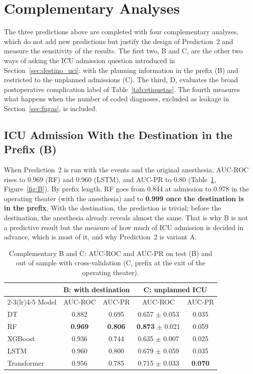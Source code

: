 \section{Complementary Analyses}

The three predictions above are completed with four complementary analyses, which do not add new predictions but justify the design of Prediction~2 and measure the sensitivity of the results. The first two, B and C, are the other two ways of asking the ICU admission question introduced in Section~\ref{sec:destino_uci}: with the planning information in the prefix (B) and restricted to the unplanned admissions (C). The third, D, evaluates the broad postoperative complication label of Table~\ref{tab:etiquetas}. The fourth measures what happens when the number of coded diagnoses, excluded as leakage in Section~\ref{sec:fugas}, is included.

\subsection{ICU Admission With the Destination in the Prefix (B)}
\label{sec:compl_b}

When Prediction~2 is run with the  events and the original anesthesia, AUC-ROC rises to 0.969 (RF) and 0.960 (LSTM), and AUC-PR to 0.80 (Table~\ref{tab:compl_bc}, Figure~\ref{fig:B}). By prefix length, RF goes from 0.844 at admission to 0.978 in the operating theater (with the  anesthesia) and to \textbf{0.999 once the destination is in the prefix}. With the destination, the prediction is trivial; before the destination, the anesthesia already reveals almost the same. That is why B is not a predictive result but the measure of how much of ICU admission is decided in advance, which is most of it, and why Prediction~2 is variant A.

\begin{table}[htbp]
\centering
\caption{Complementary B and C: AUC-ROC and AUC-PR on test (B) and out of sample with cross-validation (C, prefix at the exit of the operating theater).}
\label{tab:compl_bc}
\begin{tabular}{lcccc}
\toprule
 & \multicolumn{2}{c}{B: with destination} & \multicolumn{2}{c}{C: unplanned ICU} \\
\cmidrule(lr){2-3}\cmidrule(lr){4-5}
Model & AUC-ROC & AUC-PR & AUC-ROC & AUC-PR \\
\midrule
DT & 0.882 & 0.695 & 0.657 $\pm$ 0.053 & 0.035 \\
RF & \textbf{0.969} & \textbf{0.806} & \textbf{0.873} $\pm$ 0.021 & 0.059 \\
XGBoost & 0.936 & 0.744 & 0.635 $\pm$ 0.007 & 0.025 \\
LSTM & 0.960 & 0.800 & 0.679 $\pm$ 0.059 & 0.035 \\
Transformer & 0.956 & 0.785 & 0.715 $\pm$ 0.033 & \textbf{0.070} \\
\bottomrule
\end{tabular}
\end{table}

